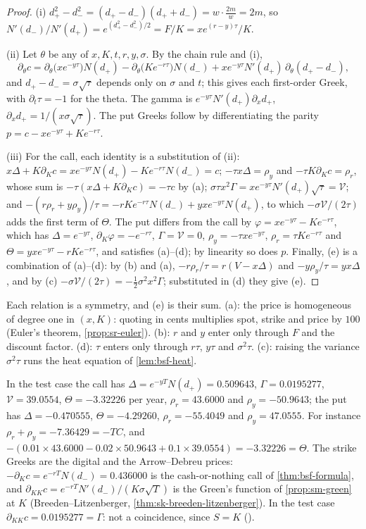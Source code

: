 \begin{proof}
(i) $d_+^2-d_-^2=(d_+-d_-)(d_++d_-)=w\cdot\frac{2m}{w}=2m$, so
$N'(d_-)/N'(d_+)=e^{(d_+^2-d_-^2)/2}=F/K=xe^{(r-y)\tau}/K$.

(ii) Let $\theta$ be any of $x,K,t,r,y,\sigma$. By the chain rule and (i),
\[
  \partial_\theta c=\partial_\theta\big(xe^{-y\tau}\big)N(d_+)-\partial_\theta\big(Ke^{-r\tau}\big)N(d_-)
  +xe^{-y\tau}N'(d_+)\,\partial_\theta(d_+-d_-),
\]
and $d_+-d_-=\sigma\sqrt\tau$ depends only on $\sigma$ and $t$; this gives each first-order Greek, with
$\partial_t\tau=-1$ for the theta. The gamma is $e^{-y\tau}N'(d_+)\partial_xd_+$, $\partial_xd_+=1/(x\sigma\sqrt\tau)$.
The put Greeks follow by differentiating the parity $p=c-xe^{-y\tau}+Ke^{-r\tau}$.

(iii) For the call, each identity is a substitution of (ii):
$x\Delta+K\partial_Kc=xe^{-y\tau}N(d_+)-Ke^{-r\tau}N(d_-)=c$; $-\tau x\Delta=\rho_y$ and
$-\tau K\partial_Kc=\rho_r$, whose sum is $-\tau(x\Delta+K\partial_Kc)=-\tau c$ by (a);
$\sigma\tau x^2\Gamma=xe^{-y\tau}N'(d_+)\sqrt\tau=\mathcal V$; and
$-(r\rho_r+y\rho_y)/\tau=-rKe^{-r\tau}N(d_-)+yxe^{-y\tau}N(d_+)$, to which $-\sigma\mathcal V/(2\tau)$ adds the
first term of $\Theta$. The put differs from the call by $\varphi=xe^{-y\tau}-Ke^{-r\tau}$, which has
$\Delta=e^{-y\tau}$, $\partial_K\varphi=-e^{-r\tau}$, $\Gamma=\mathcal V=0$, $\rho_y=-\tau xe^{-y\tau}$,
$\rho_r=\tau Ke^{-r\tau}$ and $\Theta=yxe^{-y\tau}-rKe^{-r\tau}$, and satisfies (a)--(d); by linearity so
does $p$. Finally, (e) is a combination of (a)--(d): by (b) and (a),
$-r\rho_r/\tau=r(V-x\Delta)$ and $-y\rho_y/\tau=yx\Delta$, and by (c) $-\sigma\mathcal V/(2\tau)=-\frac12\sigma^2x^2\Gamma$;
substituted in (d) they give (e).
\end{proof}

Each relation is a symmetry, and (e) is their sum. (a): the price is homogeneous of degree one in $(x,K)$:
quoting in cents multiplies spot, strike and price by $100$ (Euler's theorem, \cref{prop:sr-euler}). (b): $r$ and
$y$ enter only through $F$ and the discount factor. (d): $\tau$ enters only through $r\tau$, $y\tau$ and
$\sigma^2\tau$. (c): raising the variance $\sigma^2\tau$ runs the heat equation of \cref{lem:bsf-heat}.

In the test case the call has
$\Delta=e^{-yT}N(d_+)=0.509643$, $\Gamma=0.0195277$, $\mathcal V=39.0554$, $\Theta=-3.32226$ per year,
$\rho_r=43.6000$ and $\rho_y=-50.9643$; the put has $\Delta=-0.470555$, $\Theta=-4.29260$, $\rho_r=-55.4049$
and $\rho_y=47.0555$. For instance $\rho_r+\rho_y=-7.36429=-TC$, and
$-(0.01\times43.6000-0.02\times50.9643+0.1\times39.0554)=-3.32226=\Theta$. The strike Greeks are the
digital and the Arrow--Debreu prices: $-\partial_Kc=e^{-rT}N(d_-)=0.436000$ is the cash-or-nothing call of
\cref{thm:bsf-formula}, and $\partial_{KK}c=e^{-rT}N'(d_-)/(K\sigma\sqrt T)$ is the Green's function of
\cref{prop:sm-green} at $K$ (Breeden--Litzenberger, \cref{thm:sk-breeden-litzenberger}). In the test case
$\partial_{KK}c=0.0195277=\Gamma$: not a coincidence, since $S=K$ ().


